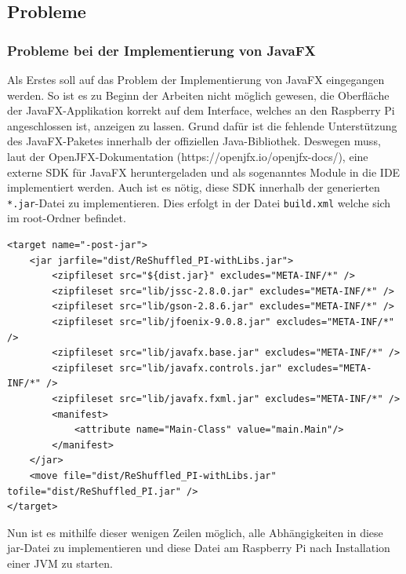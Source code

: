 \subsection{Probleme}
\subsubsection{Probleme bei der Implementierung von JavaFX}
Als Erstes soll auf das Problem der Implementierung von JavaFX eingegangen  werden.
So ist es zu Beginn der Arbeiten nicht möglich gewesen, die Oberfläche der JavaFX-Applikation korrekt auf dem Interface, welches an den Raspberry Pi angeschlossen ist, anzeigen zu lassen.
Grund dafür ist die fehlende Unterstützung des JavaFX-Paketes innerhalb der offiziellen Java-Bibliothek.
Deswegen muss, laut der OpenJFX-Dokumentation (https://openjfx.io/openjfx-docs/), eine externe SDK für JavaFX heruntergeladen und als sogenanntes Module in die IDE implementiert werden.
Auch ist es nötig, diese SDK innerhalb der generierten \lstinline[style=C]{*.jar}-Datei zu implementieren.
Dies erfolgt in der Datei \lstinline[style=C]{build.xml} welche sich im root-Ordner befindet.
\begin{lstlisting}[style=xml,caption=Teilabschnitt build.xml,label=build]
<target name="-post-jar">
    <jar jarfile="dist/ReShuffled_PI-withLibs.jar">
        <zipfileset src="${dist.jar}" excludes="META-INF/*" />
        <zipfileset src="lib/jssc-2.8.0.jar" excludes="META-INF/*" />
        <zipfileset src="lib/gson-2.8.6.jar" excludes="META-INF/*" />
        <zipfileset src="lib/jfoenix-9.0.8.jar" excludes="META-INF/*" />
        <zipfileset src="lib/javafx.base.jar" excludes="META-INF/*" />
        <zipfileset src="lib/javafx.controls.jar" excludes="META-INF/*" />
        <zipfileset src="lib/javafx.fxml.jar" excludes="META-INF/*" />
        <manifest>
            <attribute name="Main-Class" value="main.Main"/>
        </manifest>
    </jar>
    <move file="dist/ReShuffled_PI-withLibs.jar" tofile="dist/ReShuffled_PI.jar" />
</target>
\end{lstlisting}
Nun ist es mithilfe dieser wenigen Zeilen möglich, alle Abhängigkeiten in diese jar-Datei zu implementieren und diese Datei am Raspberry Pi nach Installation einer \acs{JVM} zu starten.
